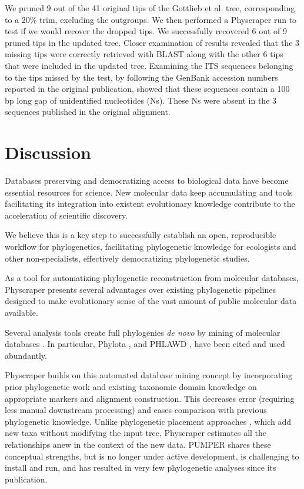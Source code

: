 \documentclass{bmcart}
\begin{document}
We pruned 9 out of the 41 original tips of the Gottlieb et al. tree, corresponding
to a 20\% trim, excluding the outgroups. We then performed a Physcraper run to test
if we would recover the dropped tips.
We successfully recovered 6 out of 9 pruned tips in the updated tree.
Closer examination of results revealed that the 3 missing tips were correctly retrieved
with BLAST along with the other 6 tips that were included in the updated tree. Examining
the ITS sequences belonging to the tips missed by the test, by following the GenBank
accession numbers reported in the original publication, showed that these sequences
contain a 100 bp long gap of unidentified nucleotides (Ns). These Ns were absent
in the 3 sequences published in the original alignment.

\section*{Discussion}
Databases preserving and democratizing access to biological data
have become essential resources for science.
New molecular data keep accumulating and tools facilitating its integration into
existent evolutionary knowledge contribute to the acceleration of scientific discovery.

We believe this is a key step to successfully establish an open, reproducible workflow for phylogenetics,
facilitating phylogenetic knowledge for ecologists and other non-specialists, effectively
democratizing phylogenetic studies.

As a tool for automatizing phylogenetic reconstruction from molecular databases,
Physcraper presents several advantages over existing phylogenetic pipelines designed to
make evolutionary sense of the vast amount of
public molecular data available.

Several analysis tools create full phylogenies \textit{de novo} by mining of molecular
databases \cite{antonelli2017toward, sanderson2008phylota, smith2019pyphlawd,
bennett2018phylotar, pearse2013phylogenerator}.
In particular, Phylota \cite{sanderson2008phylota},
and PHLAWD \cite{smith2009mega}, have been cited and used abundantly.

Physcraper builds on this automated database mining concept by incorporating prior
phylogenetic work and existing taxonomic domain knowledge on appropriate markers
and alignment construction.
This decreases error (requiring less manual downstream processing) and
eases comparison with previous phylogenetic
knowledge.
Unlike phylogenetic placement approaches \cite{berger_performance_2011, matsen_pplacer_2010},
which add new taxa without modifying the input tree, Physcraper estimates all
the relationships anew in the context of the new data.
PUMPER \cite{izquierdo2014pumper} shares these conceptual strengths, but is no
longer under active development, is challenging to install and run, and has resulted
in very few phylogenetic analyses since its publication.
\end{document}
